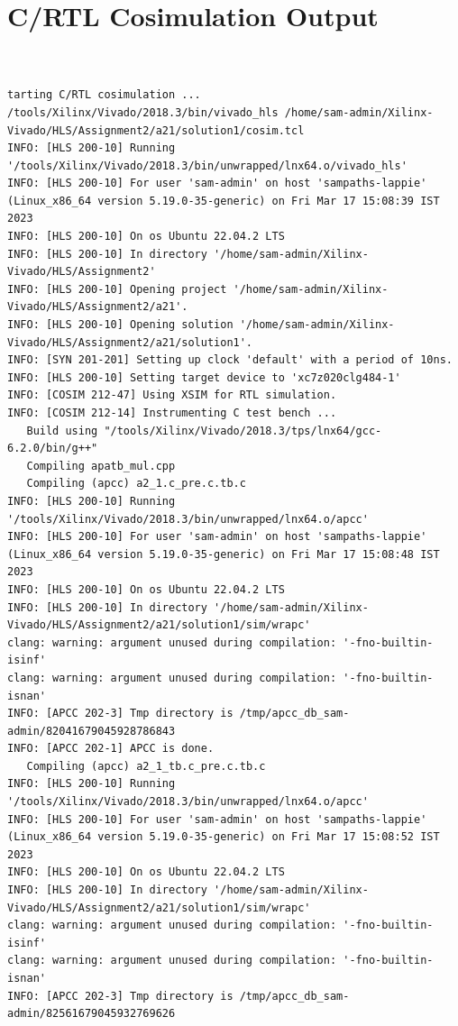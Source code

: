 \documentclass{article}
\begin{document}
\section{C/RTL Cosimulation Output}
\vspace{1cm}
\begin{lstlisting}


tarting C/RTL cosimulation ...
/tools/Xilinx/Vivado/2018.3/bin/vivado_hls /home/sam-admin/Xilinx-Vivado/HLS/Assignment2/a21/solution1/cosim.tcl
INFO: [HLS 200-10] Running '/tools/Xilinx/Vivado/2018.3/bin/unwrapped/lnx64.o/vivado_hls'
INFO: [HLS 200-10] For user 'sam-admin' on host 'sampaths-lappie' (Linux_x86_64 version 5.19.0-35-generic) on Fri Mar 17 15:08:39 IST 2023
INFO: [HLS 200-10] On os Ubuntu 22.04.2 LTS
INFO: [HLS 200-10] In directory '/home/sam-admin/Xilinx-Vivado/HLS/Assignment2'
INFO: [HLS 200-10] Opening project '/home/sam-admin/Xilinx-Vivado/HLS/Assignment2/a21'.
INFO: [HLS 200-10] Opening solution '/home/sam-admin/Xilinx-Vivado/HLS/Assignment2/a21/solution1'.
INFO: [SYN 201-201] Setting up clock 'default' with a period of 10ns.
INFO: [HLS 200-10] Setting target device to 'xc7z020clg484-1'
INFO: [COSIM 212-47] Using XSIM for RTL simulation.
INFO: [COSIM 212-14] Instrumenting C test bench ...
   Build using "/tools/Xilinx/Vivado/2018.3/tps/lnx64/gcc-6.2.0/bin/g++"
   Compiling apatb_mul.cpp
   Compiling (apcc) a2_1.c_pre.c.tb.c
INFO: [HLS 200-10] Running '/tools/Xilinx/Vivado/2018.3/bin/unwrapped/lnx64.o/apcc'
INFO: [HLS 200-10] For user 'sam-admin' on host 'sampaths-lappie' (Linux_x86_64 version 5.19.0-35-generic) on Fri Mar 17 15:08:48 IST 2023
INFO: [HLS 200-10] On os Ubuntu 22.04.2 LTS
INFO: [HLS 200-10] In directory '/home/sam-admin/Xilinx-Vivado/HLS/Assignment2/a21/solution1/sim/wrapc'
clang: warning: argument unused during compilation: '-fno-builtin-isinf'
clang: warning: argument unused during compilation: '-fno-builtin-isnan'
INFO: [APCC 202-3] Tmp directory is /tmp/apcc_db_sam-admin/82041679045928786843
INFO: [APCC 202-1] APCC is done.
   Compiling (apcc) a2_1_tb.c_pre.c.tb.c
INFO: [HLS 200-10] Running '/tools/Xilinx/Vivado/2018.3/bin/unwrapped/lnx64.o/apcc'
INFO: [HLS 200-10] For user 'sam-admin' on host 'sampaths-lappie' (Linux_x86_64 version 5.19.0-35-generic) on Fri Mar 17 15:08:52 IST 2023
INFO: [HLS 200-10] On os Ubuntu 22.04.2 LTS
INFO: [HLS 200-10] In directory '/home/sam-admin/Xilinx-Vivado/HLS/Assignment2/a21/solution1/sim/wrapc'
clang: warning: argument unused during compilation: '-fno-builtin-isinf'
clang: warning: argument unused during compilation: '-fno-builtin-isnan'
INFO: [APCC 202-3] Tmp directory is /tmp/apcc_db_sam-admin/82561679045932769626

\end{lstlisting}
\end{document}
